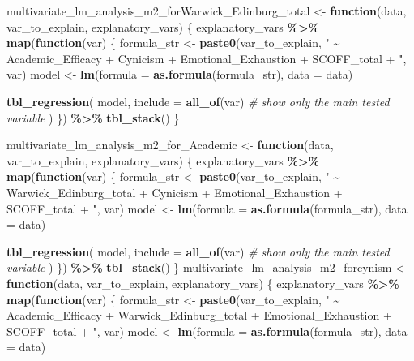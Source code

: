 \documentclass[
]{article}
\newenvironment{Shaded}{\begin{snugshade}}{\end{snugshade}}
\newcommand{\AttributeTok}[1]{\textcolor[rgb]{0.13,0.29,0.53}{#1}}
\newcommand{\CommentTok}[1]{\textcolor[rgb]{0.56,0.35,0.01}{\textit{#1}}}
\newcommand{\ControlFlowTok}[1]{\textcolor[rgb]{0.13,0.29,0.53}{\textbf{#1}}}
\newcommand{\FunctionTok}[1]{\textcolor[rgb]{0.13,0.29,0.53}{\textbf{#1}}}
\newcommand{\NormalTok}[1]{#1}
\newcommand{\OtherTok}[1]{\textcolor[rgb]{0.56,0.35,0.01}{#1}}
\newcommand{\SpecialCharTok}[1]{\textcolor[rgb]{0.81,0.36,0.00}{\textbf{#1}}}
\newcommand{\StringTok}[1]{\textcolor[rgb]{0.31,0.60,0.02}{#1}}
\begin{document}
\begin{Shaded}
\begin{Highlighting}[]
\NormalTok{multivariate\_lm\_analysis\_m2\_forWarwick\_Edinburg\_total }\OtherTok{\textless{}{-}} \ControlFlowTok{function}\NormalTok{(data, var\_to\_explain, explanatory\_vars) \{}
\NormalTok{  explanatory\_vars }\SpecialCharTok{\%\textgreater{}\%}
    \FunctionTok{map}\NormalTok{(}\ControlFlowTok{function}\NormalTok{(var) \{}
\NormalTok{      formula\_str }\OtherTok{\textless{}{-}} \FunctionTok{paste0}\NormalTok{(var\_to\_explain, }\StringTok{" \textasciitilde{} Academic\_Efficacy + Cynicism + Emotional\_Exhaustion + SCOFF\_total + "}\NormalTok{, var)}
\NormalTok{      model }\OtherTok{\textless{}{-}} \FunctionTok{lm}\NormalTok{(}\AttributeTok{formula =} \FunctionTok{as.formula}\NormalTok{(formula\_str), }\AttributeTok{data =}\NormalTok{ data)}
      
      \FunctionTok{tbl\_regression}\NormalTok{(}
\NormalTok{        model,}
        \AttributeTok{include =} \FunctionTok{all\_of}\NormalTok{(var)  }\CommentTok{\# show only the main tested variable}
\NormalTok{      )}
\NormalTok{    \}) }\SpecialCharTok{\%\textgreater{}\%}
    \FunctionTok{tbl\_stack}\NormalTok{()}
\NormalTok{\}}


\NormalTok{multivariate\_lm\_analysis\_m2\_for\_Academic }\OtherTok{\textless{}{-}} \ControlFlowTok{function}\NormalTok{(data, var\_to\_explain, explanatory\_vars) \{}
\NormalTok{  explanatory\_vars }\SpecialCharTok{\%\textgreater{}\%}
    \FunctionTok{map}\NormalTok{(}\ControlFlowTok{function}\NormalTok{(var) \{}
\NormalTok{      formula\_str }\OtherTok{\textless{}{-}} \FunctionTok{paste0}\NormalTok{(var\_to\_explain, }\StringTok{" \textasciitilde{} Warwick\_Edinburg\_total + Cynicism + Emotional\_Exhaustion + SCOFF\_total + "}\NormalTok{, var)}
\NormalTok{      model }\OtherTok{\textless{}{-}} \FunctionTok{lm}\NormalTok{(}\AttributeTok{formula =} \FunctionTok{as.formula}\NormalTok{(formula\_str), }\AttributeTok{data =}\NormalTok{ data)}
      
      \FunctionTok{tbl\_regression}\NormalTok{(}
\NormalTok{        model,}
        \AttributeTok{include =} \FunctionTok{all\_of}\NormalTok{(var)  }\CommentTok{\# show only the main tested variable}
\NormalTok{      )}
\NormalTok{    \}) }\SpecialCharTok{\%\textgreater{}\%}
    \FunctionTok{tbl\_stack}\NormalTok{()}
\NormalTok{\}}
\NormalTok{multivariate\_lm\_analysis\_m2\_forcynism }\OtherTok{\textless{}{-}} \ControlFlowTok{function}\NormalTok{(data, var\_to\_explain, explanatory\_vars) \{}
\NormalTok{  explanatory\_vars }\SpecialCharTok{\%\textgreater{}\%}
    \FunctionTok{map}\NormalTok{(}\ControlFlowTok{function}\NormalTok{(var) \{}
\NormalTok{      formula\_str }\OtherTok{\textless{}{-}} \FunctionTok{paste0}\NormalTok{(var\_to\_explain, }\StringTok{" \textasciitilde{} Academic\_Efficacy + Warwick\_Edinburg\_total + Emotional\_Exhaustion + SCOFF\_total + "}\NormalTok{, var)}
\NormalTok{      model }\OtherTok{\textless{}{-}} \FunctionTok{lm}\NormalTok{(}\AttributeTok{formula =} \FunctionTok{as.formula}\NormalTok{(formula\_str), }\AttributeTok{data =}\NormalTok{ data)}
      

\end{Highlighting}
\end{Shaded}
\end{document}
